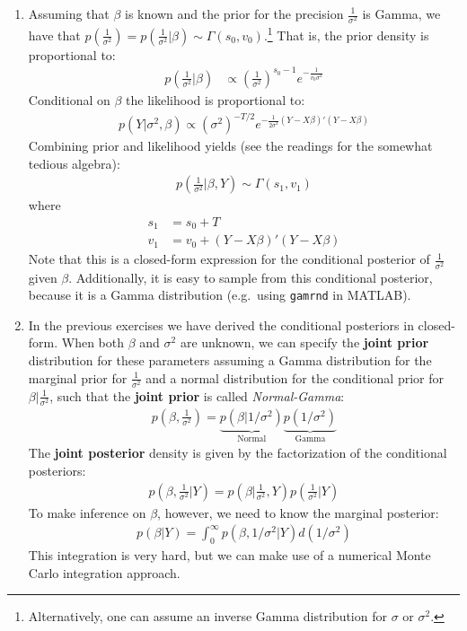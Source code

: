 \begin{enumerate}
\item Assuming that \(\beta \) is known and the prior for the precision \(\frac{1}{\sigma^2}\) is Gamma,
  we have that \(p\left(\frac{1}{\sigma^2}\right) = p\left(\frac{1}{\sigma^2}|\beta\right) \sim \Gamma(s_0,v_0)\).\footnote{%
  Alternatively, one can assume an inverse Gamma distribution for \(\sigma \) or \(\sigma^2 \).}
That is, the prior density is proportional to:
\begin{align*}
p\left(\frac{1}{\sigma^2}|\beta\right) & \propto {\left(\frac{1}{\sigma^2} \right)}^{s_0-1} e^{-\frac{1}{v_0\sigma^2}}
\end{align*}
Conditional on \(\beta \) the likelihood is proportional to:
\begin{align*}
p(Y|\sigma^2,\beta) \propto {(\sigma^2)}^{-T/2} e^{-\frac{1}{2\sigma^2} (Y-X\beta)'(Y-X\beta)}
\end{align*}
Combining prior and likelihood yields (see the readings for the somewhat tedious algebra):
\begin{align*}
p\left(\frac{1}{\sigma^2}|\beta,Y\right) \sim \Gamma(s_1,v_1)
\end{align*}
where
\begin{align*}
s_1 &= s_0 + T
\\
v_1 &= v_0 + (Y-X\beta)'(Y-X\beta)
\end{align*}
Note that this is a closed-form expression for the conditional posterior of \(\frac{1}{\sigma^2}\) given \(\beta \).
Additionally, it is easy to sample from this conditional posterior,
  because it is a Gamma distribution (e.g.\ using \texttt{gamrnd} in MATLAB).

\item In the previous exercises we have derived the conditional posteriors in closed-form.
When both \(\beta \) and \(\sigma^2\) are unknown,
  we can specify the \textbf{joint prior} distribution for these parameters assuming a Gamma distribution for the marginal prior for \(\frac{1}{\sigma^2}\)
  and a normal distribution for the conditional prior for \(\beta|\frac{1}{\sigma^2}\),
  such that the \textbf{joint prior} is called \emph{Normal-Gamma}:
\begin{align*}
p\left(\beta, \frac{1}{\sigma^2}\right) = \underbrace{p(\beta|1/\sigma^2)}_{\text{Normal}} \underbrace{p\left(1/\sigma^2\right)}_{\text{Gamma}}
\end{align*}
The \textbf{joint posterior} density is given by the factorization of the conditional posteriors:
\begin{align*}
p\left(\beta,\frac{1}{\sigma^2}|Y\right) = p\left(\beta|\frac{1}{\sigma^2},Y\right) p\left(\frac{1}{\sigma^2}|Y\right)
\end{align*}
To make inference on \(\beta \), however, we need to know the marginal posterior:
\begin{align*}
p(\beta|Y) = \int_0^\infty p(\beta,1/\sigma^2|Y) d(1/\sigma^2)
\end{align*}
This integration is very hard, but we can make use of a numerical Monte Carlo integration approach.


\end{enumerate}
